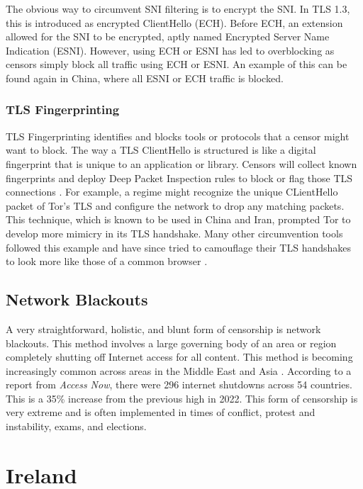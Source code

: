 The obvious way to circumvent SNI filtering is to encrypt the SNI. In TLS 1.3, this is introduced as encrypted ClientHello (ECH). Before ECH, an extension allowed for the SNI to be encrypted, aptly named Encrypted Server Name Indication (ESNI). However, using ECH or ESNI has led to overblocking as censors simply block all traffic using ECH or ESNI. An example of this can be found again in China, where all ESNI or ECH traffic is blocked.

\subsubsection{TLS Fingerprinting}

TLS Fingerprinting identifies and blocks tools or protocols that a censor might want to block. The way a TLS ClientHello is structured is like a digital fingerprint that is unique to an application or library. Censors will collect known fingerprints and deploy Deep Packet Inspection rules to block or flag those TLS connections \cite{TLSFingerprinting}. For example, a regime might recognize the unique CLientHello packet of Tor's TLS and configure the network to drop any matching packets. This technique, which is known to be used in China and Iran, prompted Tor to develop more mimicry in its TLS handshake. Many other circumvention tools followed this example and have since tried to camouflage their TLS handshakes to look more like those of a common browser \cite{TLSFingerprinting}.

\subsection{Network Blackouts}

A very straightforward, holistic, and blunt form of censorship is network blackouts. This method involves a large governing body of an area or region completely shutting off Internet access for all content. This method is becoming increasingly common across areas in the Middle East and Asia \cite{inetenetBlackouts}. According to a report from \textit{Access Now}, there were 296 internet shutdowns across 54 countries. This is a 35\% increase from the previous high in 2022. This form of censorship is very extreme and is often implemented in times of conflict, protest and instability, exams, and elections. 

\section{Ireland}
\label{sec:Ireland-Censorship}

